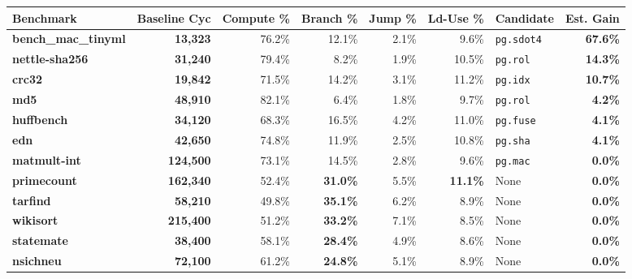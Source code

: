 \documentclass[11pt,a4paper]{article}
\begin{document}
\begin{table}[h!]
\centering
\scriptsize
\setlength{\tabcolsep}{3.2pt}
\begin{tabularx}{\textwidth}{>{\raggedright\arraybackslash}X r r r r r l r}
\toprule
\textbf{Benchmark} & \textbf{Baseline Cyc} & \textbf{Compute \%} & \textbf{Branch \%} & \textbf{Jump \%} & \textbf{Ld-Use \%} & \textbf{Candidate} & \textbf{Est. Gain} \\
\midrule
\rowcolor{green!10}\textbf{bench\_mac\_tinyml} & \textbf{13,323}  & 76.2\% & 12.1\% & 2.1\% & 9.6\%  & \texttt{pg.sdot4} & \textbf{67.6\%} \\
\rowcolor{blue!08}\textbf{nettle-sha256}    & \textbf{31,240}  & 79.4\% & 8.2\%  & 1.9\% & 10.5\% & \texttt{pg.rol}   & \textbf{14.3\%} \\
\rowcolor{blue!08}\textbf{crc32}            & \textbf{19,842}  & 71.5\% & 14.2\% & 3.1\% & 11.2\% & \texttt{pg.idx}   & \textbf{10.7\%} \\
\rowcolor{blue!08}\textbf{md5}              & \textbf{48,910}  & 82.1\% & 6.4\%  & 1.8\% & 9.7\%  & \texttt{pg.rol}   & \textbf{4.2\%}  \\
\rowcolor{blue!08}\textbf{huffbench}        & \textbf{34,120}  & 68.3\% & 16.5\% & 4.2\% & 11.0\% & \texttt{pg.fuse}  & \textbf{4.1\%}  \\
\rowcolor{blue!08}\textbf{edn}              & \textbf{42,650}  & 74.8\% & 11.9\% & 2.5\% & 10.8\% & \texttt{pg.sha}   & \textbf{4.1\%}  \\
\midrule
\rowcolor{red!06}\textbf{matmult-int}       & \textbf{124,500} & 73.1\% & 14.5\% & 2.8\% & 9.6\%  & \texttt{pg.mac}   & \textbf{0.0\%}  \\
\rowcolor{red!06}\textbf{primecount}        & \textbf{162,340} & 52.4\% & \textbf{31.0\%} & 5.5\% & \textbf{11.1\%} & None & \textbf{0.0\%} \\
\rowcolor{red!06}\textbf{tarfind}           & \textbf{58,210}  & 49.8\% & \textbf{35.1\%} & 6.2\% & 8.9\%  & None & \textbf{0.0\%} \\
\rowcolor{red!06}\textbf{wikisort}          & \textbf{215,400} & 51.2\% & \textbf{33.2\%} & 7.1\% & 8.5\%  & None & \textbf{0.0\%} \\
\rowcolor{red!06}\textbf{statemate}         & \textbf{38,400}  & 58.1\% & \textbf{28.4\%} & 4.9\% & 8.6\%  & None & \textbf{0.0\%} \\
\rowcolor{red!06}\textbf{nsichneu}          & \textbf{72,100}  & 61.2\% & \textbf{24.8\%} & 5.1\% & 8.9\%  & None & \textbf{0.0\%} \\

\end{tabularx}
\end{table}
\end{document}
